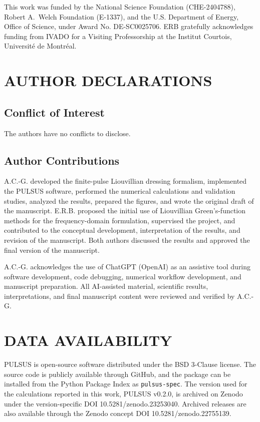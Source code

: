 \begin{acknowledgments}




This work was funded by the National Science Foundation (CHE-2404788), Robert A.\ Welch Foundation (E-1337), and the U.S. Department of Energy, Office of Science, under Award No. DE-SC0025706. ERB gratefully acknowledges funding from IVADO for a Visiting Professorship at the Institut Courtois, Universit\'e de Montr\'eal. 

\end{acknowledgments}

\section*{AUTHOR DECLARATIONS}

\subsection*{Conflict of Interest}

The authors have no conflicts to disclose.

\subsection*{Author Contributions}

A.C.-G. developed the finite-pulse Liouvillian dressing formalism,
implemented the PULSUS software, performed the numerical calculations
and validation studies, analyzed the results, prepared the figures,
and wrote the original draft of the manuscript. E.R.B. proposed the
initial use of Liouvillian Green's-function methods for the
frequency-domain formulation, supervised the project, and contributed
to the conceptual development, interpretation of the results, and
revision of the manuscript. Both authors discussed the results and
approved the final version of the manuscript.

A.C.-G. acknowledges the use of ChatGPT (OpenAI) as an assistive
tool during software development, code debugging, numerical workflow
development, and manuscript preparation. All AI-assisted material,
scientific results, interpretations, and final manuscript content were
reviewed and verified by A.C.-G.

\section*{DATA AVAILABILITY}

PULSUS is open-source software distributed under the BSD 3-Clause
license. The source code is publicly available through GitHub, and the
package can be installed from the Python Package Index as
\texttt{pulsus-spec}. The version used for the calculations reported
in this work, PULSUS v0.2.0, is archived on Zenodo under the
version-specific DOI 10.5281/zenodo.23253040. Archived releases are
also available through the Zenodo concept DOI
10.5281/zenodo.22755139.

